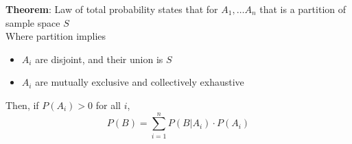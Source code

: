 \begin{framed}
   \textbf{Theorem}: Law of total probability states that for $A_1, \hdots A_n$ that is a partition of sample space $S$ \\

   Where partition implies 
   \begin{itemize}
      \item $A_i$ are disjoint, and their union is $S $
      \item $A_i$ are mutually exclusive and collectively exhaustive
   \end{itemize}

   Then, if $P(A_i) > 0$ for all $i$, 
   \[
      P(B) = \sum_{i = 1}^{n} P(B | A_i) \cdot P(A_i)
   \] 
\end{framed}


